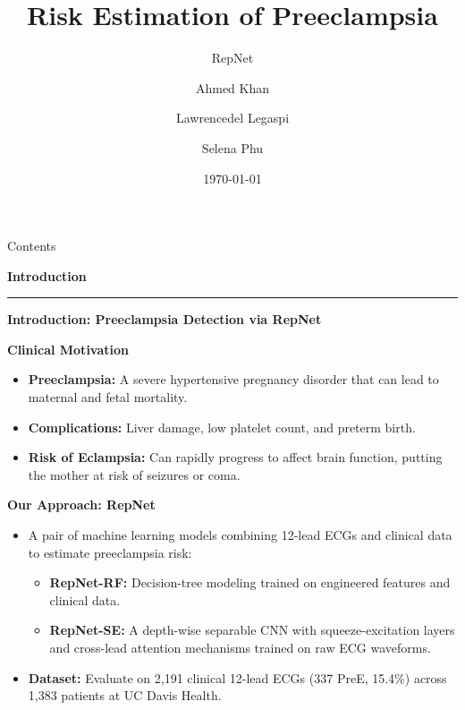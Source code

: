 \documentclass[10pt,aspectratio=169]{beamer}
\title{Risk Estimation of Preeclampsia}
\subtitle{RepNet}
\author{Ahmed Khan \and Lawrencedel Legaspi \and Selena Phu}
\institute{Department of Electrical and Computer Engineering \\ University of California, Davis}
\date{\today}
\newcommand{\Raleway}{\sffamily}
\begin{document}
{%
  \begin{frame}
    \titlepage
  \end{frame}
}

\begin{frame}{Contents}
  \tableofcontents
\end{frame}

{%
  \begin{frame}
    \vfill
    \centering
    {\Raleway\bfseries\Huge\color{white} Introduction}\\[0.6em]
    {\color{aggiegold}\rule{6cm}{0.06cm}}
    \vfill
  \end{frame}
}

\begin{frame}{\textbf{Introduction: Preeclampsia Detection via RepNet}}
    
    \textbf{Clinical Motivation}
    \begin{itemize}
        \item \textbf{Preeclampsia:} A severe hypertensive pregnancy disorder that can lead to maternal and fetal mortality.
        \item \textbf{Complications:} Liver damage, low platelet count, and preterm birth.
        \item \textbf{Risk of Eclampsia:} Can rapidly progress to affect brain function, putting the mother at risk of seizures or coma.
    \end{itemize}
    
    \vspace{0.3cm} %
    
    \textbf{Our Approach: RepNet}
    \begin{itemize}
        \item A pair of machine learning models combining 12-lead ECGs and clinical data to estimate preeclampsia risk:
        \begin{itemize}
            \item \textbf{RepNet-RF:} Decision-tree modeling trained on engineered features and clinical data.
            \item \textbf{RepNet-SE:} A depth-wise separable CNN with squeeze-excitation layers and cross-lead attention mechanisms trained on raw ECG waveforms.
        \end{itemize}
        \item \textbf{Dataset:} Evaluate on 2,191 clinical 12-lead ECGs (337 PreE, 15.4\%) across 1,383 patients at UC Davis Health.
    \end{itemize}

\end{frame}
\end{document}

